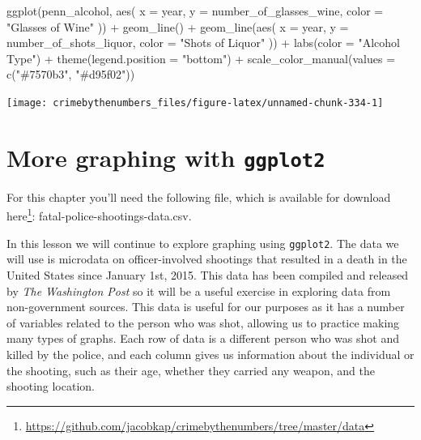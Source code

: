 \documentclass[
]{krantz}
\makeatletter
\newenvironment{Shaded}{\begin{snugshade}}{\end{snugshade}}
\newcommand{\AttributeTok}[1]{\textcolor[rgb]{0.61,0.61,0.61}{#1}}
\newcommand{\FunctionTok}[1]{\textcolor[rgb]{0,0,0}{#1}}
\newcommand{\NormalTok}[1]{#1}
\newcommand{\SpecialCharTok}[1]{\textcolor[rgb]{0,0,0}{#1}}
\newcommand{\StringTok}[1]{\textcolor[rgb]{0.5,0.5,0.5}{#1}}
\renewcommand{\href}[2]{#2\footnote{\url{#1}}}
\newenvironment{kframe}{%
\medskip{}
\setlength{\fboxsep}{.8em}
 \def\at@end@of@kframe{}%
 \ifinner\ifhmode%
  \def\at@end@of@kframe{\end{minipage}}%
  \begin{minipage}{\columnwidth}%
 \fi\fi%
 \def\FrameCommand##1{\hskip\@totalleftmargin \hskip-\fboxsep
 \colorbox{shadecolor}{##1}\hskip-\fboxsep
     \hskip-\linewidth \hskip-\@totalleftmargin \hskip\columnwidth}%
 \MakeFramed {\advance\hsize-\width
   \@totalleftmargin\z@ \linewidth\hsize
   \@setminipage}}%
 {\par\unskip\endMakeFramed%
 \at@end@of@kframe}
\renewenvironment{Shaded}{\begin{kframe}}{\end{kframe}}
\makeatother
\begin{document}
\begin{Shaded}
\begin{Highlighting}[]
\FunctionTok{ggplot}\NormalTok{(penn\_alcohol, }\FunctionTok{aes}\NormalTok{(}
  \AttributeTok{x =}\NormalTok{ year,}
  \AttributeTok{y =}\NormalTok{ number\_of\_glasses\_wine,}
  \AttributeTok{color =} \StringTok{"Glasses of Wine"}
\NormalTok{)) }\SpecialCharTok{+}
  \FunctionTok{geom\_line}\NormalTok{() }\SpecialCharTok{+}
  \FunctionTok{geom\_line}\NormalTok{(}\FunctionTok{aes}\NormalTok{(}
    \AttributeTok{x =}\NormalTok{ year,}
    \AttributeTok{y =}\NormalTok{ number\_of\_shots\_liquor,}
    \AttributeTok{color =} \StringTok{"Shots of Liquor"}
\NormalTok{  )) }\SpecialCharTok{+}
  \FunctionTok{labs}\NormalTok{(}\AttributeTok{color =} \StringTok{"Alcohol Type"}\NormalTok{) }\SpecialCharTok{+}
  \FunctionTok{theme}\NormalTok{(}\AttributeTok{legend.position =} \StringTok{"bottom"}\NormalTok{) }\SpecialCharTok{+}
  \FunctionTok{scale\_color\_manual}\NormalTok{(}\AttributeTok{values =} \FunctionTok{c}\NormalTok{(}\StringTok{"\#7570b3"}\NormalTok{, }\StringTok{"\#d95f02"}\NormalTok{))}
\end{Highlighting}
\end{Shaded}

\begin{center}\texttt{[image: crimebythenumbers\_files/figure-latex/unnamed-chunk-334-1]} \end{center}

\hypertarget{ois-graphs}{%
\chapter{\texorpdfstring{More graphing with
\texttt{ggplot2}}{More graphing with ggplot2}}\label{ois-graphs}}

For this chapter you'll need the following file, which is
available for download
\href{https://github.com/jacobkap/crimebythenumbers/tree/master/data}{here}:
fatal-police-shootings-data.csv.

In this lesson we will continue to explore graphing using
\texttt{ggplot2}. The data we will use is microdata on
officer-involved shootings that resulted in a death in the
United States since January 1st, 2015. This data has been
compiled and released by \emph{The Washington Post} so it
will be a useful exercise in exploring data from
non-government sources. This data is useful for our purposes
as it has a number of variables related to the person who
was shot, allowing us to practice making many types of
graphs. Each row of data is a different person who was shot
and killed by the police, and each column gives us
information about the individual or the shooting, such as
their age, whether they carried any weapon, and the shooting
location.
\end{document}
